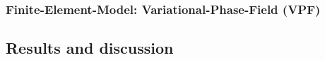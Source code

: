 \subsubsection*{Finite-Element-Model: Variational-Phase-Field (VPF)}
\subsection{Results and discussion}

